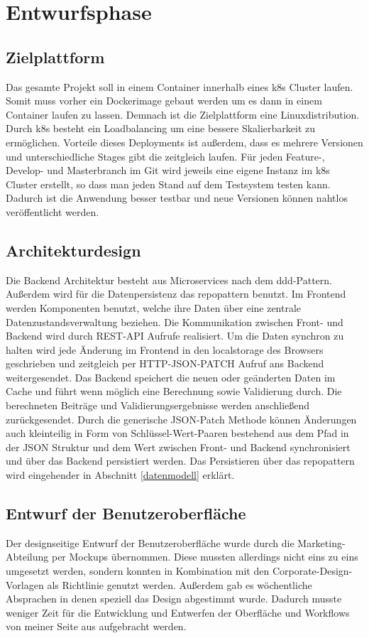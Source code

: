 \section{Entwurfsphase}
\label{entwurfsphase}
\subsection{Zielplattform}
\label{zielplattform}
Das gesamte Projekt soll in einem \gls{Container} innerhalb eines \gls{k8s} Cluster laufen. Somit muss vorher ein Dockerimage gebaut werden um es dann in einem Container laufen zu lassen. Demnach ist die Zielplattform eine Linuxdistribution. Durch \gls{k8s} besteht ein Loadbalancing um eine bessere Skalierbarkeit zu ermöglichen. Vorteile dieses Deployments ist außerdem, dass es mehrere Versionen und unterschiedliche Stages gibt die zeitgleich laufen. Für jeden Feature-, Develop- und Masterbranch im Git wird jeweils eine eigene Instanz im \gls{k8s} Cluster erstellt, so dass man jeden Stand auf dem Testsystem testen kann. Dadurch ist die Anwendung besser testbar und neue Versionen können nahtlos veröffentlicht werden.
\subsection{Architekturdesign}
\label{architekturdesign}
Die Backend Architektur besteht aus Microservices nach dem \gls{ddd}-Pattern. Außerdem wird für die Datenpersistenz das \gls{repopattern} benutzt. Im Frontend werden Komponenten benutzt, welche ihre Daten über eine zentrale Datenzustandsverwaltung beziehen. Die Kommunikation zwischen Front- und Backend wird durch REST-API Aufrufe realisiert. Um die Daten synchron zu halten wird jede Änderung im Frontend in den \gls{localstorage} des Browsers geschrieben und zeitgleich per HTTP-JSON-PATCH Aufruf ans Backend weitergesendet. Das Backend speichert die neuen oder geänderten Daten im Cache und führt wenn möglich eine Berechnung sowie Validierung durch. Die berechneten Beiträge und Validierungsergebnisse werden anschließend zurückgesendet. Durch die generische JSON-Patch Methode können Änderungen auch kleinteilig in Form von Schlüssel-Wert-Paaren bestehend aus dem Pfad in der JSON Struktur und dem Wert zwischen Front- und Backend synchronisiert und über das Backend persistiert werden. Das Persistieren über das \gls{repopattern} wird eingehender in Abschnitt \ref{datenmodell}  erklärt.
\subsection{Entwurf der Benutzeroberfläche}
\label{benutzeroberfläche}
Der designseitige Entwurf der Benutzeroberfläche wurde durch die Marketing-Abteilung per Mockups übernommen. Diese mussten allerdings nicht eins zu eins umgesetzt werden, sondern konnten in Kombination mit den Corporate-Design-Vorlagen als Richtlinie genutzt werden. Außerdem gab es wöchentliche Absprachen in denen speziell das Design abgestimmt wurde. Dadurch musste weniger Zeit für die Entwicklung und Entwerfen der Oberfläche und Workflows von meiner Seite aus aufgebracht werden.
